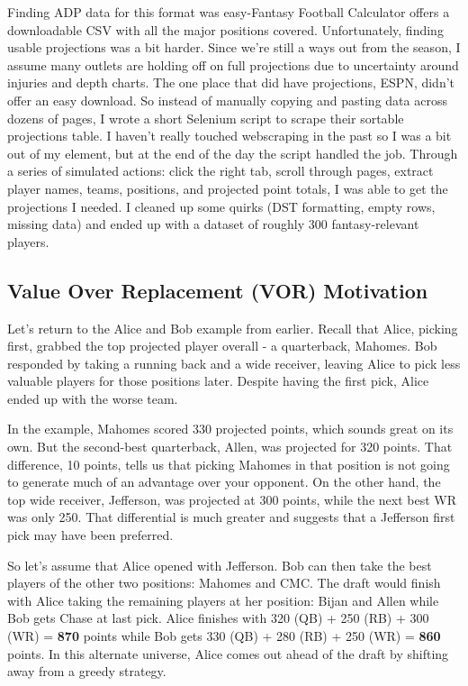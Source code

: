 \documentclass{article}
\begin{document}
Finding ADP data for this format was easy-Fantasy Football Calculator offers a downloadable CSV with all the major positions covered.
Unfortunately, finding usable projections was a bit harder.
Since we're still a ways out from the season, I assume many outlets are holding off on full projections due to uncertainty around injuries and depth charts.
The one place that did have projections, ESPN, didn't offer an easy download.
So instead of manually copying and pasting data across dozens of pages, I wrote a short Selenium script to scrape their sortable projections table.
I haven't really touched webscraping in the past so I was a bit out of my element, but at the end of the day the script handled the job.
Through a series of simulated actions: click the right tab, scroll through pages, extract player names, teams, positions, and projected point totals, I was able to get the projections I needed.
I cleaned up some quirks (DST formatting, empty rows, missing data) and ended up with a dataset of roughly 300 fantasy-relevant players.

\subsection{Value Over Replacement (VOR) Motivation}
Let's return to the Alice and Bob example from earlier.
Recall that Alice, picking first, grabbed the top projected player overall - a quarterback, Mahomes.
Bob responded by taking a running back and a wide receiver, leaving Alice to pick less valuable players for those positions later.
Despite having the first pick, Alice ended up with the worse team.

In the example, Mahomes scored 330 projected points, which sounds great on its own.
But the second-best quarterback, Allen, was projected for 320 points.
That difference, 10 points, tells us that picking Mahomes in that position is not going to generate much of an advantage over your opponent.
On the other hand, the top wide receiver, Jefferson, was projected at 300 points, while the next best WR was only 250.
That differential is much greater and suggests that a Jefferson first pick may have been preferred.

So let's assume that Alice opened with Jefferson.  Bob can then take the best players of the other two positions: Mahomes and CMC.
The draft would finish with Alice taking the remaining players at her position: Bijan and Allen while Bob gets Chase at last pick.
Alice finishes with 320 (QB) + 250 (RB) + 300 (WR) = \textbf{870} points while Bob gets 330 (QB) + 280 (RB) + 250 (WR) = \textbf{860} points.
In this alternate universe, Alice comes out ahead of the draft by shifting away from a greedy strategy.
\end{document}
